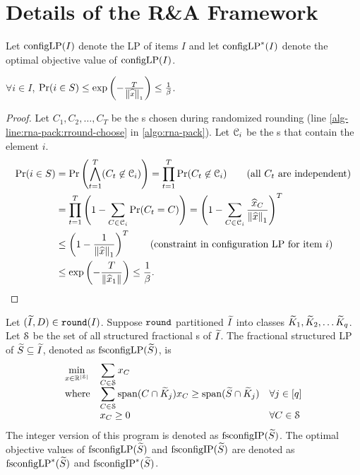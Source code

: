 \section{Details of the R\&A Framework}
\label{sec:rna-extra}

Let $\operatorname{configLP}(I)$ denote the \config{} LP of items $I$ and let $\operatorname{configLP}^*(I)$ denote the
optimal objective value of $\operatorname{configLP}(I)$.

\begin{lemma}
\label{thm:pr-elem-in-residual}
$\forall i \in I$, $\Pr(i \in S)
\le \exp\left(-\frac{T}{\left\lVert \widehat{x} \right\rVert_1}\right) \le \frac{1}{\beta}$.
\end{lemma}
\begin{proof}
Let $C_1, C_2, \ldots, C_T$ be the \config{}s chosen during randomized rounding
(line \ref{alg-line:rna-pack:rround-choose} in \cref{algo:rna-pack}).
Let $\mathcal{C}_i$ be the \config{}s that contain the element $i$.
\begin{align*}
\Pr(i \in S) &= \Pr\left(\bigwedge_{t=1}^T (C_t \not\in \Ccal_i) \right)
= \prod_{t=1}^T \Pr(C_t \not\in \Ccal_i)  \tag{all $C_t$ are independent}
\\ &= \prod_{t=1}^T \left(1 - \sum_{C \in \Ccal_i} \Pr(C_t = C)\right)
= \left(1 - \sum_{C \in \Ccal_i} \frac{\widehat{x}_C}{\norm{\widehat{x}}_1} \right)^T
\\ &\le \left(1 - \frac{1}{\norm{\widehat{x}}_1} \right)^T
\tag{constraint in \config{} LP for item $i$}
\\ &\le \exp\left( - \frac{T}{\norm{\widehat{x}_1}} \right)
\le \frac{1}{\beta}.
\qedhere
\end{align*}
\end{proof}

\begin{definition}
Let $(\widetilde{I}, D) \in \operatorname{\mathtt{round}}(I)$. Suppose $\operatorname{\mathtt{round}}$ partitioned $\widetilde{I}$ into classes
$\widetilde{K}_1, \widetilde{K}_2, \ldots \widetilde{K}_q$.
Let $\mathcal{S}$ be the set of all structured fractional \config{}s of $\widetilde{I}$.
The fractional structured \config{} LP of $\widetilde{S} \subseteq \widetilde{I}$,
denoted as $\operatorname{fsconfigLP}(\widetilde{S})$, is
\[ \begin{array}{*3{>{\displaystyle}l}}
\min_{x \in \mathbb{R}^{|\Scal|}}
    & \multicolumn{2}{>{\displaystyle}l}{\sum_{C \in \Scal} x_C}
\\ \textrm{where} & \sum_{C \in \Scal} \Span(C \cap \Ktild_j)x_C
    \ge \Span(\Stild \cap \Ktild_j) & \forall j \in [q]
\\ & x_C \ge 0 & \forall C \in \Scal
\end{array} \]
The integer version of this program is denoted as $\operatorname{fsconfigIP}(\widetilde{S})$.
The optimal objective values of $\operatorname{fsconfigLP}(\widetilde{S})$ and $\operatorname{fsconfigIP}(\widetilde{S})$
are denoted as $\operatorname{fsconfigLP}^*(\widetilde{S})$ and $\operatorname{fsconfigIP}^*(\widetilde{S})$.
\end{definition}

